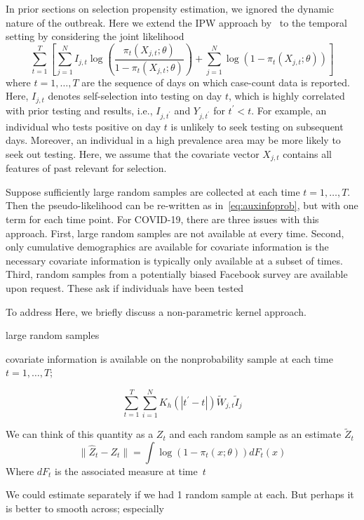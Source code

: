\documentclass[11pt]{amsart}
\begin{document}
In prior sections on selection propensity estimation, we ignored the dynamic nature of the outbreak.  Here we extend the IPW approach by~\cite{Chen2019} to the temporal setting by considering the joint likelihood
\begin{equation}
\label{eq:tvpropensity}
\sum_{t=1}^T \left[ \sum_{j=1}^N I_{j,t} \log \left( \frac{\pi_t (X_{j,t}; \theta)}{1-\pi_t(X_{j,t}; \theta)} \right) + \sum_{j=1}^N \log \left( 1 - \pi_t (X_{j,t}; \theta) \right) \right]
\end{equation}
where $t=1,\ldots,T$ are the sequence of days on which case-count data is reported.  Here, $I_{j,t}$ denotes self-selection into testing on day $t$, which is highly correlated with prior testing and results, i.e., $I_{j,t^\prime}$ and $Y_{j,t^\prime}$ for $t^\prime < t$.  For example, an individual who tests positive on day $t$ is unlikely to seek testing on subsequent days.  Moreover, an individual in a high prevalence area may be more likely to seek out testing.  Here, we assume that the covariate vector $X_{j,t}$ contains all features of past relevant for selection.

Suppose sufficiently large random samples are collected at each time $t =1,\ldots,T$.  Then the pseudo-likelihood can be re-written as in~\eqref{eq:auxinfoprob}, but with one term for each time point.  For COVID-19, there are three issues with this approach.  First, large random samples are not available at every time.  Second, only cumulative demographics are available for  covariate information is  the necessary covariate information is typically only available at a subset of times. Third, random samples from a potentially biased Facebook survey are available upon request. These ask if individuals have been tested


To address
Here, we briefly discuss a non-parametric kernel approach.

large random samples

covariate information is available on the nonprobability sample at each time $t=1,\ldots,T$;


$$
\sum_{t=1}^T \sum_{i=1}^N K_h(|t^\prime - t|) \tilde W_{j,t} \tilde I_j
$$


We can think of this quantity as a $Z_t$ and each random sample as an estimate $\tilde Z_t$
$$
\| \hat Z_t - Z_t \| = \int \log \left( 1 - \pi_t (x; \theta) \right) dF_t (x)
$$
Where $dF_t$ is the associated measure at time~$t$

We could estimate separately if we had 1 random sample at each.  But perhaps it is better to smooth across; especially
\end{document}
